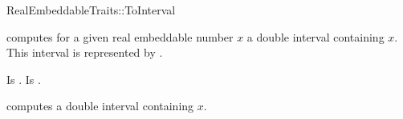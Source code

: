 \begin{ccRefFunctionObjectConcept}{RealEmbeddableTraits::ToInterval}

\ccDefinition

 computes for a given real embeddable 
number $x$ a double interval containing $x$. 
This interval is represented by . %
 
\ccRefines 


\ccTypes
{} 
        { Is .}
        { Is .}

\ccOperations
{}

        { computes a double interval containing $x$.}


\ccSeeAlso

\\

\end{ccRefFunctionObjectConcept} 